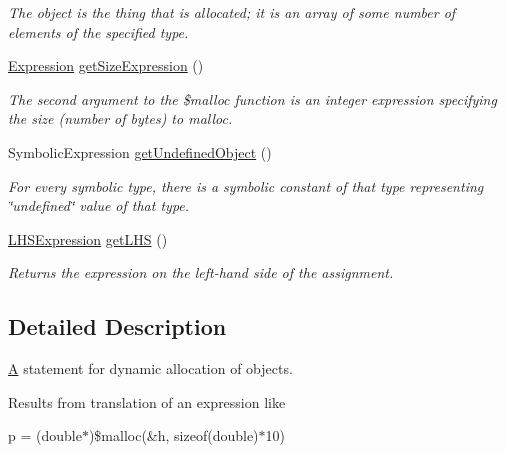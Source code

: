 \begin{DoxyCompactItemize}
\begin{DoxyCompactList}\small\item\em The object is the thing that is allocated; it is an array of some number of elements of the specified type. \end{DoxyCompactList}\item 
\hyperlink{interfaceedu_1_1udel_1_1cis_1_1vsl_1_1civl_1_1model_1_1IF_1_1expression_1_1Expression}{Expression} \hyperlink{interfaceedu_1_1udel_1_1cis_1_1vsl_1_1civl_1_1model_1_1IF_1_1statement_1_1MallocStatement_aac53eca91ab139f6717926f69e3dfc13}{get\+Size\+Expression} ()
\begin{DoxyCompactList}\small\item\em The second argument to the \$malloc function is an integer expression specifying the size (number of bytes) to malloc. \end{DoxyCompactList}\item 
Symbolic\+Expression \hyperlink{interfaceedu_1_1udel_1_1cis_1_1vsl_1_1civl_1_1model_1_1IF_1_1statement_1_1MallocStatement_a6866c8d8b34a27192a52c543a7963984}{get\+Undefined\+Object} ()
\begin{DoxyCompactList}\small\item\em For every symbolic type, there is a symbolic constant of that type representing \char`\"{}undefined\char`\"{} value of that type. \end{DoxyCompactList}\item 
\hyperlink{interfaceedu_1_1udel_1_1cis_1_1vsl_1_1civl_1_1model_1_1IF_1_1expression_1_1LHSExpression}{L\+H\+S\+Expression} \hyperlink{interfaceedu_1_1udel_1_1cis_1_1vsl_1_1civl_1_1model_1_1IF_1_1statement_1_1MallocStatement_a7c6ffb8ed3f43e217dee0b3f5fefe4ae}{get\+L\+H\+S} ()
\begin{DoxyCompactList}\small\item\em Returns the expression on the left-\/hand side of the assignment. \end{DoxyCompactList}\end{DoxyCompactItemize}


\subsection{Detailed Description}
\hyperlink{structA}{A} statement for dynamic allocation of objects. 

Results from translation of an expression like

{\ttfamily p = (double$\ast$)\$malloc(\&h, sizeof(double)$\ast$10)}

